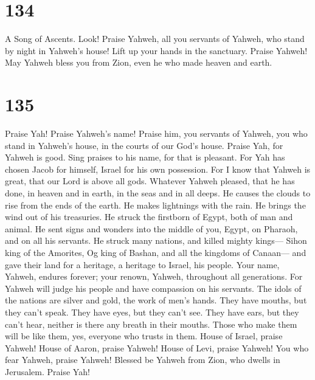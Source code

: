 \hypertarget{section-126}{%
\section{134}\label{section-126}}

A Song of Ascents.  Look! Praise Yahweh, all you servants
of Yahweh, who stand by night in Yahweh's house!  Lift up
your hands in the sanctuary. Praise Yahweh!  May Yahweh
bless you from Zion, even he who made heaven and earth.

\hypertarget{section-127}{%
\section{135}\label{section-127}}

 Praise Yah! Praise Yahweh's name! Praise him, you
servants of Yahweh,  you who stand in Yahweh's house, in
the courts of our God's house.  Praise Yah, for Yahweh is
good. Sing praises to his name, for that is pleasant.  For
Yah has chosen Jacob for himself, Israel for his own possession.
 For I know that Yahweh is great, that our Lord is above
all gods.  Whatever Yahweh pleased, that he has done, in
heaven and in earth, in the seas and in all deeps.  He
causes the clouds to rise from the ends of the earth. He makes
lightnings with the rain. He brings the wind out of his treasuries.
 He struck the firstborn of Egypt, both of man and animal.
 He sent signs and wonders into the middle of you, Egypt,
on Pharaoh, and on all his servants.  He struck many
nations, and killed mighty kings---  Sihon king of the
Amorites, Og king of Bashan, and all the kingdoms of Canaan---
 and gave their land for a heritage, a heritage to
Israel, his people.  Your name, Yahweh, endures forever;
your renown, Yahweh, throughout all generations.  For
Yahweh will judge his people and have compassion on his servants.
 The idols of the nations are silver and gold, the work
of men's hands.  They have mouths, but they can't speak.
They have eyes, but they can't see.  They have ears, but
they can't hear, neither is there any breath in their mouths.
 Those who make them will be like them, yes, everyone who
trusts in them.  House of Israel, praise Yahweh! House of
Aaron, praise Yahweh!  House of Levi, praise Yahweh! You
who fear Yahweh, praise Yahweh!  Blessed be Yahweh from
Zion, who dwells in Jerusalem. Praise Yah!

